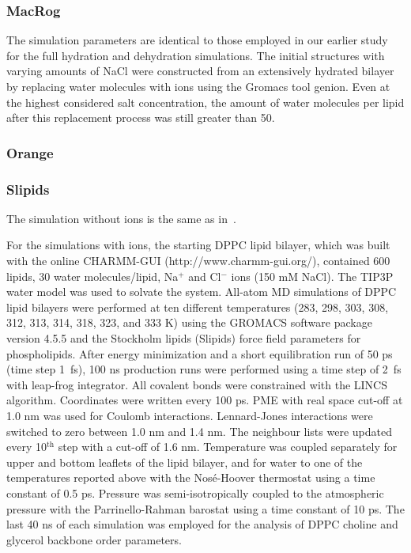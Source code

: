\documentclass[pre,aps,floatfix,authordate1-4,twocolumn]{revtex4-1}
\begin{document}
\subsubsection{MacRog}
The simulation parameters are identical to those employed in our earlier study~\cite{botan15} for the full 
hydration and dehydration simulations. The initial structures with varying amounts of NaCl were constructed from an 
extensively hydrated bilayer by replacing water molecules with ions using the Gromacs tool genion. Even at the highest 
considered salt concentration, the amount of water molecules per lipid after this replacement process was still greater than 50.

\subsubsection{Orange}

\subsubsection{Slipids}
The simulation without ions is the same as in~\cite{botan15}.

For the simulations with ions, the starting DPPC lipid bilayer, which was built with the online CHARMM-GUI
(http://www.charmm-gui.org/), contained 600 lipids, 30 water molecules/lipid, Na$^+$ and Cl$^-$ ions (150 mM NaCl). 
The TIP3P water model was used to solvate the system. All-atom MD simulations of DPPC lipid bilayers were performed 
at ten different temperatures (283, 298, 303, 308, 312, 313, 314, 318, 323, and 333 K) using the GROMACS software 
package version 4.5.5 and the Stockholm lipids (Slipids) force field parameters for phospholipids. After energy 
minimization and a short equilibration run of 50 ps (time step 1~fs), 100 ns production runs were performed using 
a time step of 2~fs with leap-frog integrator. All covalent bonds were constrained with the LINCS
algorithm. Coordinates were written every 100 ps. PME with real space cut-off at 1.0 nm was used for Coulomb 
interactions. Lennard-Jones interactions were switched to zero between 1.0 nm and 1.4 nm. The neighbour 
lists were updated every 10$^\mathrm{th}$ step with a cut-off of 1.6 nm. Temperature was coupled separately for upper and 
bottom leaflets of the lipid bilayer, and for water to one of the temperatures reported above with the Nos\'e-Hoover 
thermostat using a time constant of 0.5 ps. Pressure was semi-isotropically coupled to the atmospheric pressure 
with the Parrinello-Rahman barostat using a time constant of 10 ps.
The last 40 ns of each simulation was employed for the analysis of DPPC choline and glycerol backbone order parameters.
\end{document}

